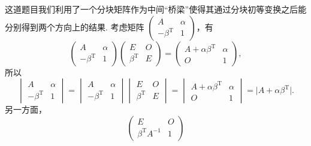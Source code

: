 \documentclass[12pt,fontset=fandol]{ctexart}
\begin{document}
\begin{solve}
这道题目我们利用了一个分块矩阵作为中间``桥梁''使得其通过分块初等变换之后能分别得到两个方向上的结果. 考虑矩阵 $\begin{pmatrix}
                A                   & \alpha \\
                -\beta^{\mathrm{T}} & 1
            \end{pmatrix}$，有
            \[\begin{pmatrix}
                    A                   & \alpha \\
                    -\beta^{\mathrm{T}} & 1
                \end{pmatrix} \begin{pmatrix}
                    E                  & O \\
                    \beta^{\mathrm{T}} & E
                \end{pmatrix} = \begin{pmatrix}
                    A+\alpha \beta^{\mathrm{T}} & \alpha \\
                    O                           & 1
                \end{pmatrix},\]
            所以
            \[\begin{vmatrix}
                    A                   & \alpha \\
                    -\beta^{\mathrm{T}} & 1
                \end{vmatrix} = \begin{vmatrix}
                    A                   & \alpha \\
                    -\beta^{\mathrm{T}} & 1
                \end{vmatrix} \begin{vmatrix}
                    E                  & O \\
                    \beta^{\mathrm{T}} & E
                \end{vmatrix} = \begin{vmatrix}
                    A+\alpha \beta^{\mathrm{T}} & \alpha \\
                    O                           & 1
                \end{vmatrix} = \lvert A+\alpha \beta^{\mathrm{T}} \rvert.\]
            另一方面，
            \[\begin{pmatrix}
                    E                        & O \\
                    \beta^{\mathrm{T}}A^{-1} & 1

\end{pmatrix}\]
\end{solve}
\end{document}
